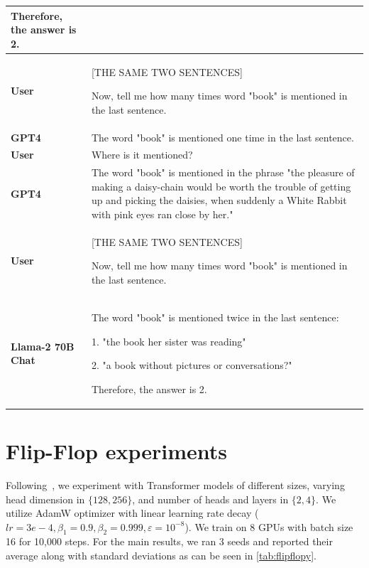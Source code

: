 \documentclass{article}
\begin{document}
\begin{table}[h!]
\begin{tabular}{m{1.4cm}m{11.5cm}}
    Therefore, the answer is 2.
    \\
    \midrule
    \midrule
    \bf User & [THE SAME TWO SENTENCES]
    \newline
    
    Now, tell me how many times word "book" is mentioned in the last sentence. \\
    \midrule
    \bf GPT4 & The word "book" is mentioned one time in the last sentence. \\
    \midrule
    \bf User & Where is it mentioned? \\
    \midrule
    \bf GPT4 & The word "book" is mentioned in the phrase "the pleasure of making a daisy-chain would be worth the trouble of getting up and picking the daisies, when suddenly a White Rabbit with pink eyes ran close by her." \\
    \midrule
    \midrule
    \bf User & [THE SAME TWO SENTENCES]
    \newline
    
    Now, tell me how many times word "book" is mentioned in the last sentence. \\
    \midrule
    \bf Llama-2 70B Chat & The word "book" is mentioned twice in the last sentence: 
    \newline
    
    1. "the book her sister was reading"
    
    2. "a book without pictures or conversations?"
    \newline
    
    Therefore, the answer is 2.
        \\
    \bottomrule
    \end{tabular}
\end{table}

\newpage
\section{Flip-Flop experiments}
\label{appendix:flipflop_details}

Following~\cite{liu2024exposing}, we experiment with Transformer models of different sizes, varying head dimension in $\{128, 256\}$, and number of heads and layers in $\{2,4\}$. We  utilize AdamW optimizer with linear learning rate decay ($lr=3e-4,\beta_1=0.9, \beta_2=0.999, \varepsilon=10^{-8}$). We train on 8 GPUs with batch size 16 for 10,000 steps.
For the main results, we ran 3 seeds and reported their average along with standard deviations as can be seen in \cref{tab:flipflopy}.
\end{document}

